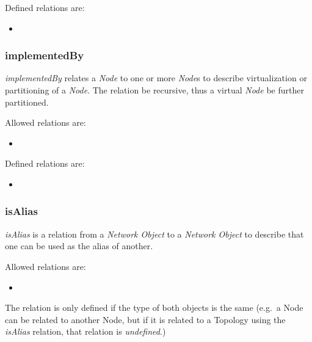Defined relations are:
\begin{itemize}
    \item {}
\end{itemize}


\subsubsection{implementedBy}%
\label{rel:implementedBy}

\emph{implementedBy} relates a \emph{Node} to one or more \emph{Node}s to describe virtualization or partitioning of a \emph{Node}. 
The relation \MAY{} be recursive, thus a virtual \emph{Node} \MAY{} be further partitioned.

Allowed relations are:
\begin{itemize}
    \item {}
\end{itemize}

Defined relations are:
\begin{itemize}
    \item {}
\end{itemize}

\subsubsection{isAlias}%
\label{rel:isAlias}

\emph{isAlias} is a relation from a \emph{Network Object} to a \emph{Network Object} to describe that one can be used as the alias of another.

Allowed relations are:
\begin{itemize}
    \item {}
\end{itemize}

The relation is only defined if the type of both objects is the same (e.g.\ a Node can be related to another Node, but if it is related to a Topology using the \emph{isAlias} relation, that relation is \emph{undefined}.)



